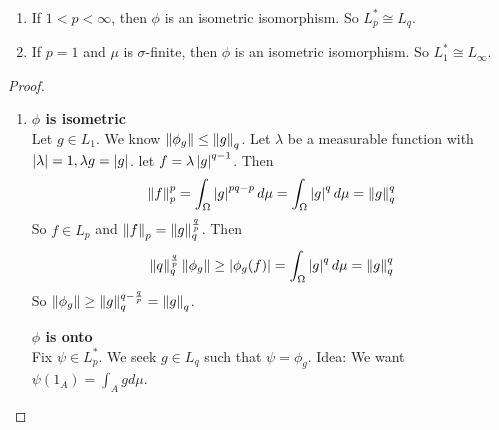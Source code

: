 \documentclass{article}
\begin{document}
\begin{nthm}\label{thm:lp-dual}~
  \begin{enumerate}
    \item If $1 < p < \infty$, then $\phi$ is an isometric isomorphism. So $L_p^* \cong L_q$.
    \item If $p = 1$ and $\mu$ is $\sigma$-finite, then $\phi$ is an isometric isomorphism. So $L_1^* \cong L_\infty$.
  \end{enumerate}
\end{nthm}
\begin{proof}~
  \begin{enumerate}
    \item {\bf $\phi$ is isometric} \\
    Let $g \in L_1$. We know $\left\lVert \phi_g\right\rVert \le \left\lVert g\right\rVert_q$. Let $\lambda$ be a measurable function with $\left\lvert \lambda\right\rvert = 1, \lambda g = \left\lvert g\right\rvert$. let $f = \lambda\left\lvert g\right\rvert^{q - 1}$. Then
    $$\left\lVert f\right\rVert_p^p = \int_\Omega \left\lvert g\right\rvert^{pq - p} d\mu = \int_\Omega \left\lvert g\right\rvert^q d\mu = \left\lVert g\right\rVert_q^q$$
    So $f \in L_p$ and $\left\lVert f\right\rVert_p = \left\lVert g\right\rVert_q^{\frac qp}$. Then
    $$\left\lVert q\right\rVert_q^{\frac qp}\left\lVert \phi_g\right\rVert \ge \left\lvert \phi_g(f)\right\rvert = \int_\Omega \left\lvert g\right\rvert^q d\mu = \left\lVert g\right\rVert_q^q$$
    So $\left\lVert \phi_g\right\rVert \ge \left\lVert g\right\rVert_q^{q - \frac qp} = \left\lVert g\right\rVert_q$.

    {\bf $\phi$ is onto} \\
    Fix $\psi \in L_p^*$. We seek $g \in L_q$ such that $\psi = \phi_g$. Idea: We want $\psi(1_A) = \int_A g d\mu$.


\end{enumerate}
\end{proof}
\end{document}
